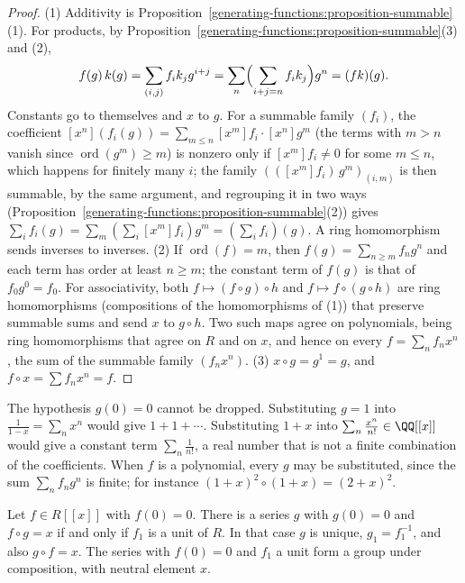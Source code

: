 \begin{proof}
(1) Additivity is Proposition~\ref{generating-functions:proposition-summable}(1). For products, by Proposition~\ref{generating-functions:proposition-summable}(3) and (2),
\[
f(g)\,k(g) = \sum_{(i,j)}f_ik_jg^{i+j} = \sum_n\Bigl(\sum_{i+j=n}f_ik_j\Bigr)g^n = (fk)(g).
\]
Constants go to themselves and $x$ to $g$. For a summable family $(f_i)$, the coefficient $[x^n](f_i(g)) = \sum_{m \leq n}[x^m]f_i \cdot [x^n]g^m$ (the terms with $m > n$ vanish since
$\operatorname{ord}(g^m) \geq m$) is nonzero only if $[x^m]f_i \neq 0$ for some $m \leq n$, which happens for finitely many $i$; the family $(([x^m]f_i)\,g^m)_{(i,m)}$ is then summable, by the same argument, and regrouping it
in two ways (Proposition~\ref{generating-functions:proposition-summable}(2)) gives $\sum_if_i(g) = \sum_m(\sum_i[x^m]f_i)g^m = (\sum_if_i)(g)$. A ring homomorphism sends inverses to inverses.
(2) If $\operatorname{ord}(f) = m$, then $f(g) = \sum_{n \geq m}f_ng^n$ and each term has order at least $n \geq m$; the constant term of $f(g)$ is that of $f_0g^0 = f_0$. For associativity, both
$f \mapsto (f \circ g) \circ h$ and $f \mapsto f \circ (g \circ h)$ are ring homomorphisms (compositions of the homomorphisms of (1)) that preserve summable sums and send $x$ to $g \circ h$. Two such
maps agree on polynomials, being ring homomorphisms that agree on $R$ and on $x$, and hence on every $f = \sum_n f_nx^n$, the sum of the summable family $(f_nx^n)$.
(3) $x \circ g = g^1 = g$, and $f \circ x = \sum f_nx^n = f$.
\end{proof}

\begin{counterexample}\label{generating-functions:counterexample-composition}
The hypothesis $g(0) = 0$ cannot be dropped. Substituting $g = 1$ into $\frac{1}{1 - x} = \sum_nx^n$ would give $1 + 1 + \cdots$. Substituting $1 + x$ into $\sum_n\frac{x^n}{n!} \in \QQ[[x]]$ would give
a constant term $\sum_n\frac1{n!}$, a real number that is not a finite combination of the coefficients. When $f$ is a polynomial, every $g$ may be substituted, since the sum $\sum_nf_ng^n$ is
finite; for instance $(1 + x)^2 \circ (1 + x) = (2 + x)^2$.
\end{counterexample}

\begin{proposition}\label{generating-functions:proposition-compositional-inverse}
Let $f \in R[[x]]$ with $f(0) = 0$. There is a series $g$ with $g(0) = 0$ and $f \circ g = x$ if and only if $f_1$ is a unit of $R$. In that case $g$ is unique, $g_1 = f_1^{-1}$, and also
$g \circ f = x$. The series with $f(0) = 0$ and $f_1$ a unit form a group under composition, with neutral element $x$.
\end{proposition}


